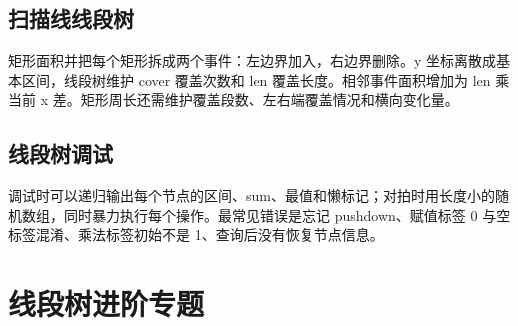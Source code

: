 \subsection{扫描线线段树}

矩形面积并把每个矩形拆成两个事件：左边界加入，右边界删除。y 坐标离散成基本区间，线段树维护 cover 覆盖次数和 len 覆盖长度。相邻事件面积增加为 len 乘当前 x 差。矩形周长还需维护覆盖段数、左右端覆盖情况和横向变化量。

\subsection{线段树调试}

调试时可以递归输出每个节点的区间、sum、最值和懒标记；对拍时用长度小的随机数组，同时暴力执行每个操作。最常见错误是忘记 pushdown、赋值标签 0 与空标签混淆、乘法标签初始不是 1、查询后没有恢复节点信息。



\section{线段树进阶专题}
